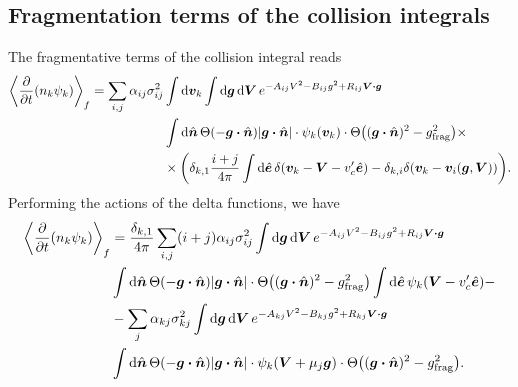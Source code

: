 \documentclass[aps,prl,preprint,groupedaddress,10pt]{revtex4-2}
\begin{document}
\subsection{Fragmentation terms of the collision integrals}
The fragmentative terms of the collision integral reads
\begin{equation}
    \begin{split}
        \avg{\pdv{t}(n_k\psi_k)}_f=\sum_{i,j}\alpha_{ij}\sigma_{ij}^2&\int\dd{\bv_k}\int
        \dd{\bg}\dd{\bV}e^{-A_{ij}V^2-B_{ij}g^2+R_{ij}\bV\vdot\bg}\\
        &\int\dd{\bn}\Theta\pqty{-\bg\vdot\bn}\abs{\bg\vdot\bn}\cdot\psi_k(\bv_k)\cdot
        \Theta\pqty{(\bg\vdot\bn)^2-\ltx{g}{frag}^2}\times\\
        &\times\pqty{\delta_{k,1}\frac{i+j}{4\pi}\int\dd{\be}\delta\pqty{\bv_k-\bV-v'_c\be}
            -\delta_{k,i}\delta\pqty{\bv_k-\bv_i(\bg,\bV)}}.
    \end{split}
\end{equation}
Performing the actions of the delta functions, we have
\begin{equation}
    \begin{split}
        \avg{\pdv{t}(n_k\psi_k)}_f&=\frac{\delta_{k,1}}{4\pi}\sum_{i,j}(i+j)
        \alpha_{ij}\sigma_{ij}^2\int\dd{\bg}\dd{\bV}e^{-A_{ij}V^2-B_{ij}g^2+R_{ij}\bV\vdot\bg}\\
        &\int\dd{\bn}\Theta\pqty{-\bg\vdot\bn}\abs{\bg\vdot\bn}\cdot
        \Theta\pqty{(\bg\vdot\bn)^2-\ltx{g}{frag}^2}
        \int\dd{\be}\psi_k(\bV-v'_c\be)-\\
        &-\sum_{j}\alpha_{kj}\sigma_{kj}^2\int
        \dd{\bg}\dd{\bV}e^{-A_{kj}V^2-B_{kj}g^2+R_{kj}\bV\vdot\bg}\\
        &\int\dd{\bn}\Theta\pqty{-\bg\vdot\bn}\abs{\bg\vdot\bn}\cdot\psi_k(\bV+\mu_j\bg)\cdot
        \Theta\pqty{(\bg\vdot\bn)^2-\ltx{g}{frag}^2}.
    \end{split}
\end{equation}
\end{document}
